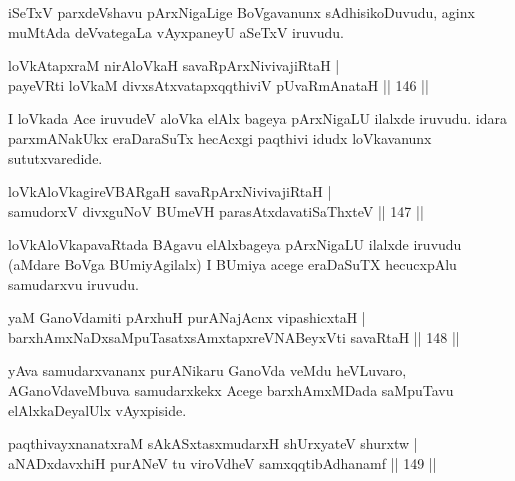 \begin{artha}
iSeTxV parxdeVshavu pArxNigaLige BoVgavanunx sAdhisikoDuvudu, aginx muMtAda deVvategaLa vAyxpaneyU aSeTxV iruvudu.
\end{artha}


\begin{shl}
loVkAtapxraM nirAloVkaH savaRpArxNivivajiRtaH |\\
payeVRti loVkaM divxsAtxvatapxqqthiviV pUvaRmAnataH \hfill || 146 ||
\end{shl}

\begin{artha}
I loVkada Ace iruvudeV aloVka elAlx bageya pArxNigaLU ilalxde iruvudu. idara parxmANakUkx eraDaraSuTx hecAcxgi paqthivi idudx loVkavanunx sututxvaredide.
\end{artha}

\begin{shl}
loVkAloVkagireVBARgaH savaRpArxNivivajiRtaH |\\
samudorxV divxguNoV BUmeVH parasAtxdavatiSaThxteV \hfill || 147 ||
\end{shl}

\begin{artha}
loVkAloVkapavaRtada BAgavu elAlxbageya pArxNigaLU ilalxde iruvudu (aMdare BoVga BUmiyAgilalx) I BUmiya acege eraDaSuTX hecucxpAlu samudarxvu iruvudu.
\end{artha}

\begin{shl}
\footnotemark{}yaM GanoVdamiti pArxhuH purANajAcnx vipashicxtaH |\\
barxhAmxNaDxsaMpuTasatxsAmxtapxreVNABeyxVti savaRtaH \hfill || 148 ||
\end{shl}

\begin{artha}
yAva samudarxvananx purANikaru GanoVda veMdu heVLuvaro, AGanoVdaveMbuva samudarxkekx Acege barxhAmxMDada saMpuTavu elAlxkaDeyalUlx vAyxpiside.
\end{artha}


\begin{shl}
paqthivayxnanatxraM sAkASxtasxmudarxH shUrxyateV shurxtw |\\
aNADxdavxhiH purANeV tu viroVdheV samxqqtibAdhanamf \hfill || 149 ||
\end{shl}

